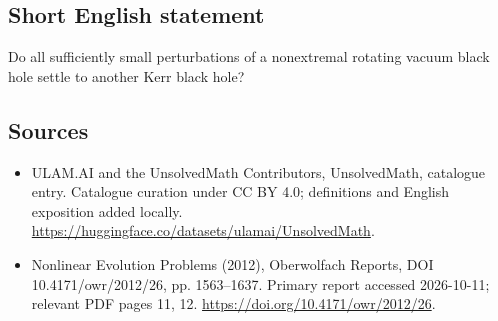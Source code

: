 \documentclass[11pt]{article}
\begin{document}
\subsection{Short English statement}
Do all sufficiently small perturbations of a nonextremal rotating vacuum black hole settle to another Kerr black hole?
\subsection{Sources}
\begin{itemize}
\item[\hypertarget{source:statement:1}{S1}] ULAM.AI and the UnsolvedMath Contributors, UnsolvedMath, catalogue entry. Catalogue curation under CC BY 4.0; definitions and English exposition added locally.
\url{https://huggingface.co/datasets/ulamai/UnsolvedMath}.
\item[\hypertarget{source:statement:2}{S2}] Nonlinear Evolution Problems (2012), Oberwolfach Reports, DOI 10.4171/owr/2012/26, pp. 1563--1637. Primary report accessed 2026-10-11; relevant PDF pages 11, 12.
\url{https://doi.org/10.4171/owr/2012/26}.
\end{itemize}
\label{end:statement}
\end{document}
